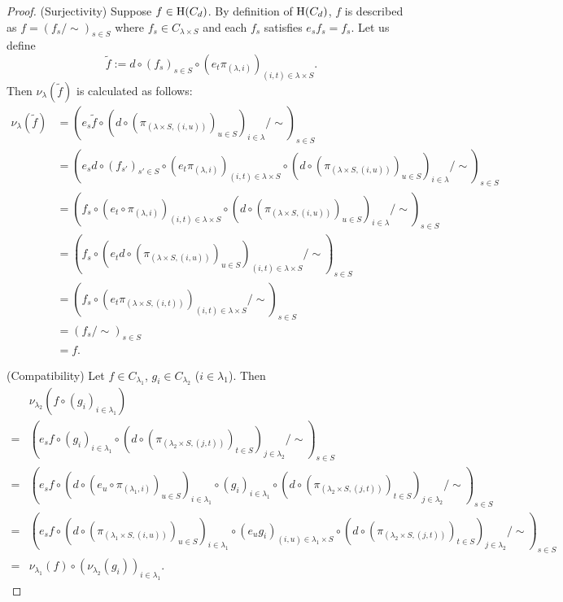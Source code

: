 \documentclass[a4paper,10pt]{article}
\theoremstyle{definition}
\newcommand\mc{\mathclose}
\begin{document}
\begin{proof}
(Surjectivity)
Suppose $f\in {\rm H}(C_d)$.
By definition of ${\rm H}(C_d)$, $f$ is described as
$f=(f_s/\mc\sim)_{s\in S}$ where $f_s\in C_{\lambda\times S}$
and each $f_s$ satisfies $e_sf_s=f_s$.
Let us define
\[
\tilde{f}:=d\circ (f_s)_{s\in S}
\circ(e_t\pi_{(\lambda,i)})_{(i,t)\in\lambda\times S}.
\]
Then $\nu_\lambda(\tilde{f})$ is calculated as follows:
\begin{align*}
\nu_\lambda(\tilde{f})
&= \left(e_s\tilde{f} \circ
 (d\circ (\pi_{(\lambda\times S,(i,u))})_{u\in S})_{i\in\lambda}/\sim\right)_{s\in S}\\
&=\left(e_s d\circ (f_{s'})_{s'\in S}
\circ(e_t\pi_{(\lambda,i)})_{(i,t)\in\lambda\times S}
\circ (d\circ (\pi_{(\lambda\times S,(i,u))})_{u\in S})_{i\in\lambda}/\mc\sim\right)_{s\in S}\\
&=\left(f_{s}
\circ (e_t\circ \pi_{(\lambda,i)})_{(i,t)\in\lambda\times S}
\circ (d\circ (\pi_{(\lambda\times S,(i,u))})_{u\in S})_{i\in\lambda}/\mc\sim\right)_{s\in S}\\
&=\left(f_{s}
\circ (e_td\circ (\pi_{(\lambda\times S,(i,u))})_{u\in S})_{(i,t)\in\lambda\times S}/\sim\right)_{s\in S}\\
&=\left(f_{s}
\circ (e_t\pi_{(\lambda\times S,(i,t))})_{(i,t)\in\lambda\times S}/\mc\sim\right)_{s\in S}\\
&=(f_{s}/\mc\sim)_{s\in S}\\
&=f.
\end{align*}

(Compatibility)
Let $f\in C_{\lambda_1}$, $g_i\in C_{\lambda_2}$ ($i\in \lambda_1$).
Then 
\begin{align*}
&\nu_{\lambda_2}(f\circ (g_i)_{i\in\lambda_1})\\
=&\left(e_s f\circ(g_i)_{i\in\lambda_1}
  \circ(d\circ(\pi_{(\lambda_2\times S,(j,t))})_{t\in S})_{j\in\lambda_2}/\mc\sim\right)_{s\in S}\\
=&\left(e_s f
  \circ (d\circ(e_u\circ \pi_{(\lambda_1,i)})_{u\in S})_{i\in\lambda_1}
  \circ(g_i)_{i\in\lambda_1}
  \circ(d\circ(\pi_{(\lambda_2\times S,(j,t))})_{t\in S})_{j\in\lambda_2}/\mc\sim\right)_{s\in S}\\
=&\left(e_s f
  \circ (d\circ(\pi_{(\lambda_1\times S,(i,u))})_{u\in S})_{i\in\lambda_1}
  \circ(e_u g_i)_{(i,u)\in\lambda_1\times S}
  \circ(d\circ(\pi_{(\lambda_2\times S,(j,t))})_{t\in S})_{j\in\lambda_2}/\mc\sim\right)_{s\in S}\\
=&\nu_{\lambda_1}(f)\circ (\nu_{\lambda_2}(g_i))_{i\in\lambda_1}.
\end{align*}
\end{proof}
\end{document}
